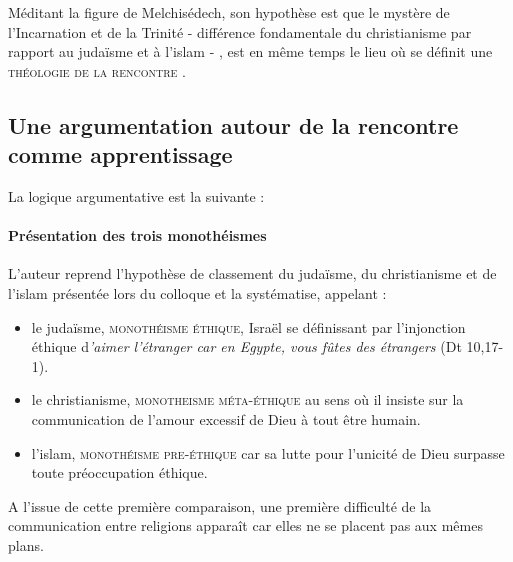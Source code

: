 \begin{comment}
    
En fonction de la problématique de l’auteur, vous établissez la thèse (ou hypothèse) de l’article ou du texte étudié : quelle solution l’auteur apporte-t-il à sa question ? quelle perspective établit-il ? Là encore, il n’est pas difficile de trouver cette thèse exposée de manière explicite dans le texte lui-même. 

\end{comment}
 Méditant la figure de Melchisédech, son hypothèse est que le mystère de l'Incarnation et de la Trinité - différence fondamentale du christianisme par rapport au judaïsme et à l'islam - ,  est en même temps le lieu  où se définit une\textsc{ théologie de la rencontre} \cite[p. 793]{theobald_christianisme_2007}. 
 
 


\subsection{Une argumentation autour de la rencontre comme apprentissage}

\begin{comment}
   Présentez la logique argumentative en fonction de laquelle l’auteur établit sa thèse (passe de l’hypothèse à la thèse vérifiée). 
\end{comment}

La logique argumentative est la suivante : 

\paragraph{Présentation des trois monothéismes}  L'auteur reprend l'hypothèse de classement du judaïsme, du christianisme et de l'islam présentée lors du colloque \cite[p.13]{centre_sevres_paris_unique_1996} et la systématise, appelant :
\begin{itemize}
    \item le judaïsme, \textsc{monothéisme éthique}, Israël se définissant par l'injonction éthique d\textit{'aimer l'étranger car en Egypte, vous fûtes des étrangers} (Dt 10,17-1).  
    \item le christianisme, \textsc{monotheisme méta-éthique} au sens où il insiste sur la communication de l'amour excessif de Dieu à tout être humain.
    \item l'islam, \textsc{monothéisme pre-éthique} car sa lutte pour l'unicité de Dieu surpasse toute préoccupation éthique. 
\end{itemize}
 A l'issue de cette première comparaison, une première difficulté de la communication entre religions apparaît car elles ne se placent pas aux mêmes plans. 


